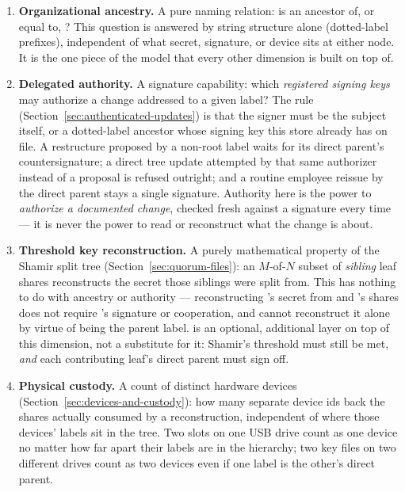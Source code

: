 \begin{enumerate}
  \item \textbf{Organizational ancestry.} A pure naming relation: is
   an ancestor of, or equal to, ? This question is
  answered by string structure alone (dotted-label prefixes), independent
  of what secret, signature, or device sits at either node. It is the one
  piece of the model that every other dimension is built on top of.
  \item \textbf{Delegated authority.} A signature capability: which
  \emph{registered signing keys} may authorize a change addressed to a
  given label? The rule (Section~\ref{sec:authenticated-updates}) is that
  the signer must be the subject itself, or a dotted-label ancestor whose
  signing key this store already has on file. A restructure proposed by a
  non-root label waits for its direct parent's countersignature; a direct
  tree update attempted by that same authorizer instead of a proposal is
  refused outright; and a routine employee reissue by the direct parent
  stays a single signature. Authority here is the power to \emph{authorize
  a documented change}, checked fresh against a signature every time --- it
  is never the power to read or reconstruct what the change is about.
  \item \textbf{Threshold key reconstruction.} A purely mathematical
  property of the Shamir split tree (Section~\ref{sec:quorum-files}): an
  $M$-of-$N$ subset of \emph{sibling} leaf shares reconstructs the secret
  those siblings were split from. This has nothing to do with ancestry or
  authority --- reconstructing 's secret from  and
  's shares does not require 's signature or
  cooperation, and  cannot reconstruct it alone by virtue of being
  the parent label.  is an optional,
  additional layer on top of this dimension, not a substitute for it:
  Shamir's threshold must still be met, \emph{and} each contributing leaf's
  direct parent must sign off.
  \item \textbf{Physical custody.} A count of distinct hardware devices
  (Section~\ref{sec:devices-and-custody}): how many separate device ids
  back the shares actually consumed by a reconstruction, independent of
  where those devices' labels sit in the tree. Two slots on one USB drive
  count as one device no matter how far apart their labels are in the
  hierarchy; two key files on two different drives count as two devices
  even if one label is the other's direct parent.
\end{enumerate}

